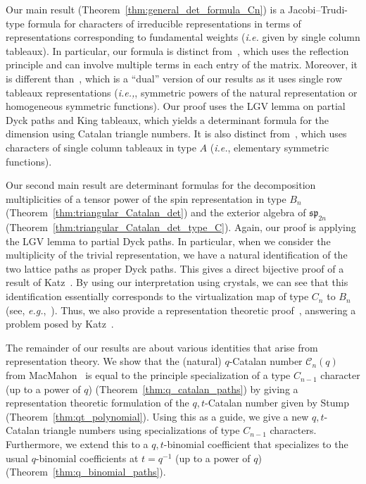 \documentclass[11pt, leqno]{amsart}
\theoremstyle{plain}
\theoremstyle{definition}
\numberwithin{equation}{section}
\newcommand{\Cat}{\mathcal{C}} %
\begin{document}
Our main result (Theorem~\ref{thm:general_det_formula_Cn}) is a Jacobi--Trudi-type formula for characters of irreducible representations in terms of representations corresponding to fundamental weights (\textit{i.e.} given by single column tableaux).
In particular, our formula is distinct from~\cite[Eq.~(3.9),~(3.10) and~(3.11)]{FK97}, which uses the reflection principle and can involve multiple terms in each entry of the matrix.
Moreover, it is different than~\cite[Thm.~3.2]{SV16}, which is a ``dual'' version of our results as it uses single row tableaux representations (\textit{i.e.,}, symmetric powers of the natural representation or homogeneous symmetric functions).
Our proof uses the LGV lemma on partial Dyck paths and King tableaux, which yields a determinant formula for the dimension using Catalan triangle numbers.
It is also distinct from~\cite{KT87}, which uses characters of single column tableaux in type $A$ (\textit{i.e.}, elementary symmetric functions).

Our second main result are determinant formulas for the decomposition multiplicities of a tensor power of the spin representation in type $B_n$ (Theorem~\ref{thm:triangular_Catalan_det}) and the exterior algebra of $\mathfrak{sp}_{2n}$ (Theorem~\ref{thm:triangular_Catalan_det_type_C}). Again, our proof is applying the LGV lemma to partial Dyck paths. In particular, when we consider the multiplicity of the trivial representation, we have a natural identification of the two lattice paths as proper Dyck paths. This gives a direct bijective proof of a result of Katz~\cite[Thm~1.4]{Katz16}. By using our interpretation using crystals, we can see that this identification essentially corresponds to the virtualization map of type $C_n$ to $B_n$ (see, {\it e.g.},~\cite{K96,OSS03III,OSS03II,SchillingS15}). Thus, we also provide a representation theoretic proof~\cite[Thm.~1.4]{Katz16}, answering a problem posed by Katz~\cite[Sec.~4]{Katz16}.

The remainder of our results are about various identities that arise from representation theory. We show that the (natural) $q$-Catalan number $\Cat_n(q)$ from MacMahon~\cite{MacMahon15} is equal to the principle specialization of a type $C_{n-1}$ character (up to a power of $q$) (Theorem~\ref{thm:q_catalan_paths}) by giving a representation theoretic formulation of the $q,t$-Catalan number given by Stump~\cite{Stump08} (Theorem~\ref{thm:qt_polynomial}). Using this as a guide, we give a new $q,t$-Catalan triangle numbers using specializations of type $C_{n-1}$ characters. 
Furthermore, we extend this to a $q,t$-binomial coefficient that specializes to the usual $q$-binomial coefficients at $t = q^{-1}$ (up to a power of $q$) (Theorem~\ref{thm:q_binomial_paths}).
\end{document}
